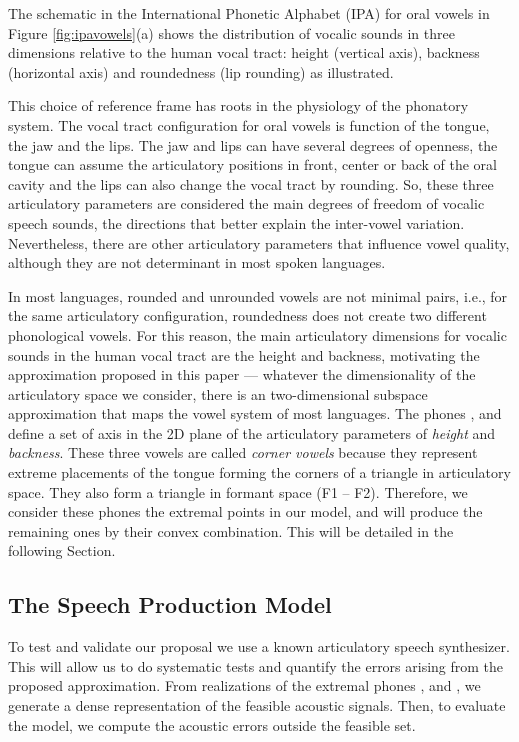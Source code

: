 The schematic in the International Phonetic Alphabet (IPA) for oral
vowels in Figure \ref{fig:ipavowels}(a) shows the distribution of
vocalic sounds in three dimensions relative to the human vocal tract:
height (vertical axis), backness (horizontal axis) and roundedness
(lip rounding) \cite{IPA} as illustrated.
 
This choice of reference frame has roots in the physiology of the
phonatory system. The vocal tract configuration for oral vowels is
function of the tongue, the jaw and the lips. The jaw and lips can
have several degrees of openness, the tongue can assume the
articulatory positions in front, center or back of the oral cavity and
the lips can also change the vocal tract by rounding. So, these three
articulatory parameters are considered the main degrees of freedom of
vocalic speech sounds, the directions that better explain the
inter-vowel variation. Nevertheless, there are other articulatory
parameters that influence vowel quality, although they are not
determinant in most spoken languages.

In most languages, rounded and unrounded vowels are not minimal pairs,
i.e., for the same articulatory configuration, roundedness does not
create two different phonological vowels. For this reason, the main
articulatory dimensions for vocalic sounds in the human vocal tract
are the height and backness, motivating the approximation proposed in
this paper --- whatever the dimensionality of the articulatory space
we consider, there is an two-dimensional subspace approximation that
maps the vowel system of most languages.
The phones  \textipa{[i]}, \textipa{[a]} and \textipa{[u]} define a
set of axis in the 2D plane of the articulatory parameters of
\emph{height} and \emph{backness}. These three vowels are called
\emph{corner vowels} because they represent extreme placements of the
tongue forming the corners of a triangle in articulatory space. They
also form a triangle in formant space (F1 --
F2)\cite{TITZE}. Therefore, we consider these phones the extremal
points in our model, and will produce the remaining ones by their
convex combination. This will be detailed in the following Section.

\subsection{The Speech Production Model}
To test and validate our proposal we use a known articulatory speech
synthesizer. This will allow us to do systematic tests and quantify
the errors arising from the proposed approximation. From realizations
of the extremal phones \textipa{[i]}, \textipa{[a]} and \textipa{[u]},
we generate a dense representation of the feasible acoustic
signals. Then, to evaluate the model, we compute the acoustic errors
outside the feasible set.


